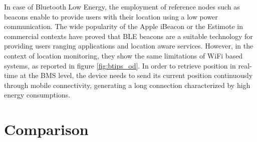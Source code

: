 In case of Bluetooth Low Energy, the employment of reference nodes such as beacons enable to provide users with their location using a low power communication. The wide popularity of the Apple iBeacon or the Estimote in commercial contexts have proved that BLE beacons are a suitable technology for providing users ranging applications and location aware services. However, in the context of location monitoring, they show the same limitations of WiFi based systems, as reported in figure \ref{fig:btips_od}. In order to retrieve position in real-time at the BMS level, the device needs to send its current position continuously through mobile connectivity, generating a long connection characterized by high energy consumptions.



\section{Comparison}
\label{sec:comparison}

